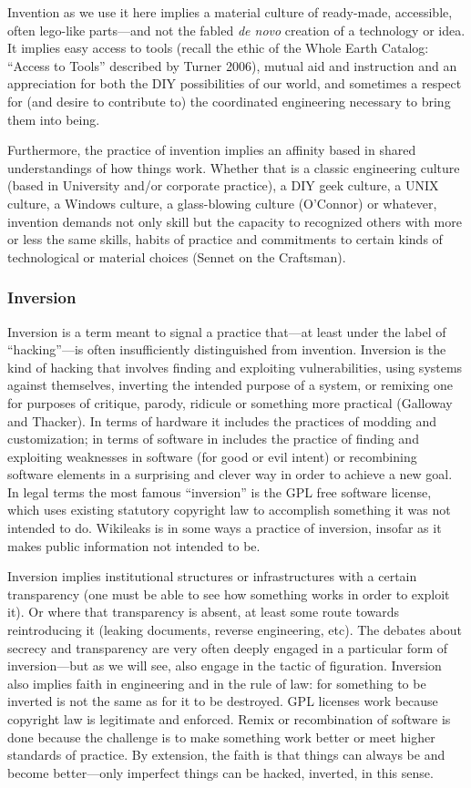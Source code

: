 \documentclass[10pt,letter,oneside]{scrartcl}
\begin{document}
Invention as we use it here implies a material culture of ready-made, accessible, often lego-like parts---and not the fabled \emph{de novo} creation of a technology or idea.  It implies easy access to tools (recall the ethic of the Whole Earth Catalog: ``Access to Tools'' described by Turner 2006), mutual aid and instruction and an appreciation for both the DIY possibilities of our world, and sometimes a respect for (and desire to contribute to) the coordinated engineering necessary to bring them into being.

Furthermore, the practice of invention implies an affinity based in shared understandings of how things work.  Whether that is a classic engineering culture (based in University and/or corporate practice), a DIY geek culture, a UNIX culture, a Windows culture, a glass-blowing culture (O’Connor) or whatever, invention demands not only skill but the capacity to recognized others with more or less the same skills, habits of practice and commitments to certain kinds of technological or material choices (Sennet on the Craftsman).

\subsubsection{Inversion}

Inversion is a term meant to signal a practice that---at least under the label of ``hacking''---is often insufficiently distinguished from invention.  Inversion is the kind of hacking that involves finding and exploiting vulnerabilities, using systems against themselves, inverting the intended purpose of a system, or remixing one for purposes of critique, parody, ridicule or something more practical (Galloway and Thacker).  In terms of hardware it includes the practices of modding and customization; in terms of software in includes the practice of finding and exploiting weaknesses in software (for good or evil intent) or recombining software elements in a surprising and clever way in order to achieve a new goal.  In legal terms the most famous ``inversion'' is the GPL free software license, which uses existing statutory copyright law to accomplish something it was not intended to do.  Wikileaks is in some ways a practice of inversion, insofar as it makes public information not intended to be. 

Inversion implies institutional structures or infrastructures with a certain transparency (one must be able to see how something works in order to exploit it).  Or where that transparency is absent, at least some route towards reintroducing it (leaking documents, reverse engineering, etc). The debates about secrecy and transparency are very often deeply engaged in a particular form of inversion---but as we will see, also engage in the tactic of figuration.  Inversion also implies faith in engineering and in the rule of law: for something to be inverted is not the same as for it to be destroyed.  GPL licenses work because copyright law is legitimate and enforced.  Remix or recombination of software is done because the challenge is to make something work better or meet higher standards of practice.  By extension, the faith is that things can always be and become better—only imperfect things can be hacked, inverted, in this sense.
\end{document}
